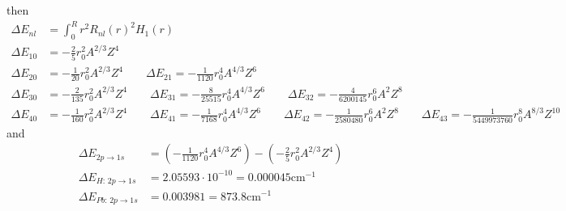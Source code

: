 \documentclass[10pt,a4paper]{book}
\theoremstyle{definition}
\begin{document}
then
\begin{align}
\Delta E_{nl}&=\int_0^Rr^2R_{nl}(r)^2H_1(r)\\
\Delta E_{10}&=-\frac{2}{5}r_0^2A^{2/3}Z^4\\
\Delta E_{20}&=-\frac{1}{20}r_0^2A^{2/3}Z^4\qquad
\Delta E_{21}=-\frac{1}{1120}r_0^4A^{4/3}Z^6\\
\Delta E_{30}&=-\frac{2}{135}r_0^2A^{2/3}Z^4\qquad
\Delta E_{31}=-\frac{8}{25515}r_0^4A^{4/3}Z^6\qquad
\Delta E_{32}=-\frac{4}{6200145}r_0^6A^{2}Z^8\\
\Delta E_{40}&=-\frac{1}{160}r_0^2A^{2/3}Z^4\qquad
\Delta E_{41}=-\frac{1}{7168}r_0^4A^{4/3}Z^6\qquad
\Delta E_{42}=-\frac{1}{2580480}r_0^6A^{2}Z^8\qquad
\Delta E_{43}=-\frac{1}{5449973760}r_0^8A^{8/3}Z^10
\end{align}
and
\begin{align}
\Delta E_{2p\rightarrow1s}&=\left(-\frac{1}{1120}r_0^4A^{4/3}Z^6\right)-\left(-\frac{2}{5}r_0^2A^{2/3}Z^4\right)\\
\Delta E_{H:\,2p\rightarrow1s}&=2.05593\cdot10^{-10}=0.000045\text{cm}^{-1}\\
\Delta E_{Pb:\,2p\rightarrow1s}&=0.003981=873.8\text{cm}^{-1}
\end{align}
\end{document}

